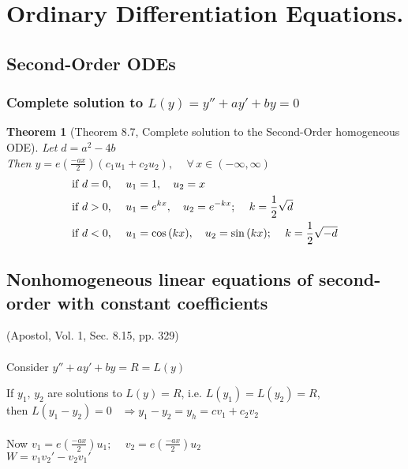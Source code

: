 \documentclass[twoside]{amsart}
\theoremstyle{plain}
\newtheorem{theorem}{Theorem}
\theoremstyle{definition}
\begin{document}
\section{ Ordinary Differentiation Equations. }

\subsection{ Second-Order ODEs}
\subsubsection{ Complete solution to $L(y) = y'' + ay' + by = 0$ } 
\begin{theorem}[Theorem 8.7, Complete solution to the Second-Order homogeneous ODE]
  Let $d= a^2 - 4b$ \medskip \\
  Then $y = e\left( \frac{-ax}{2} \right) (c_1 u_1 + c_2 u_2), \quad \, \forall \, x \in (-\infty, \infty )$
\begin{align*}
  & \text{ if $d=0$, \quad $u_1 = 1, \quad u_2 = x $ } \\
  & \text{ if $d>0$, \quad $u_1 = e^{kx}, \quad u_2 = e^{-kx} $; \quad $ k =\frac{1}{2}\sqrt{d} $ } \\
  & \text{ if $d<0$, \quad $u_1 = \cos{(kx)}, \quad u_2 = \sin{(kx)} $; \quad $ k =\frac{1}{2}\sqrt{-d} $ }
\end{align*}
\end{theorem}

\subsection{ Nonhomogeneous linear equations of second-order with constant coefficients }
(Apostol, Vol. 1, Sec. 8.15, pp. 329) \\ \quad \\
Consider $y'' + ay' + by = R = L(y)$

If $y_1, \, y_2$ are solutions to $L(y) = R$, i.e. $L(y_1) = L(y_2) = R$, \\
\phantom{ If } then $L(y_1 - y_2) = 0$ \quad \quad \, $\Longrightarrow y_1 - y_2 = y_h = cv_1 + c_2v_2$ \quad \\ \quad \\

Now $v_1 = e\left( \frac{-ax}{2} \right) u_1; \quad \, v_2 = e\left( \frac{-ax}{2} \right)u_2$ \medskip \\
$W = v_1 v_2' - v_2 v_1' $
\end{document}

